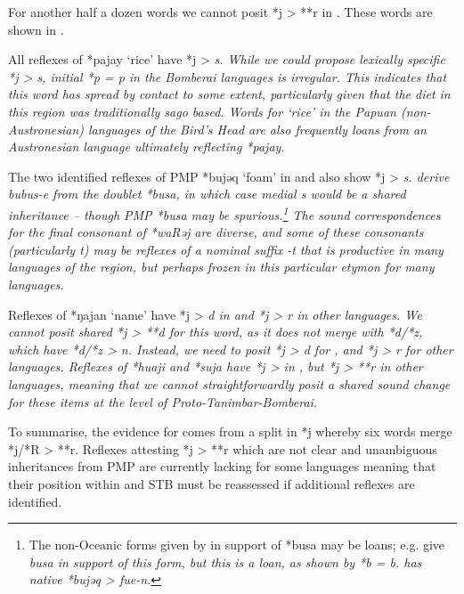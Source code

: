 For another half a dozen words we cannot posit *j > **r in .
These words are shown in .

All reflexes of *pajay ‘rice’ have *j > \it{s}.
While we could propose lexically specific *j > \it{s},
initial *p = \it{p} in the Bomberai languages is irregular.
This indicates that this word has spread by contact to some extent,
particularly given that the diet in this region was traditionally sago based.
Words for ‘rice’ in the Papuan (non-Austronesian) languages of
the Bird’s Head are also frequently loans from an Austronesian
language ultimately reflecting *pajay.

The two identified reflexes of PMP *bujəq ‘foam’ in 
and  also show *j > \it{s.} \citet{BlustTrussel2020} derive
 \it{bu{\tl}bus-e} from the doublet *busa,
in which case medial \it{s} would be a shared inheritance -- though
PMP *busa may be spurious.\footnote{
		The non-Oceanic forms given by \citet{BlustTrussel2020} in support
		of *busa may be  loans; e.g.
		\citet{BlustTrussel2020} give  \it{busa} in support of this
		form, but this is a  loan,
		as shown by *b = \it{b.}  has native *bujəq > \it{fue-n.}}
The sound correspondences for the final consonant of *waRəj
are diverse, and some of these consonants (particularly \it{t}) may be reflexes
of a nominal suffix \it{-t} that is productive in many languages
of the region, but perhaps frozen in this particular etymon for many languages.

Reflexes of *ŋajan ‘name’ have *j > \it{d} in  and *j > \it{r} in other languages.
We cannot posit shared *j > **d for this word,
as it does not merge with  *d/*z,
which have *d/*z > \it{n}.
Instead, we need to posit *j > \it{d} for ,
and *j > \it{r} for other languages.
Reflexes of *huaji and *suja have *j > {\0} in ,
but *j > **r in other languages,
meaning that we cannot straightforwardly posit a shared sound
change for these items at the level of Proto-Tanimbar-Bomberai.

To summarise, the evidence for  comes
from a split in *j whereby six words merge *j/*R > **r.
Reflexes attesting *j > **r which are not clear and
unambiguous inheritances from PMP are currently lacking for some
 languages meaning that their position
within  and STB must
be reassessed if additional reflexes are identified.
